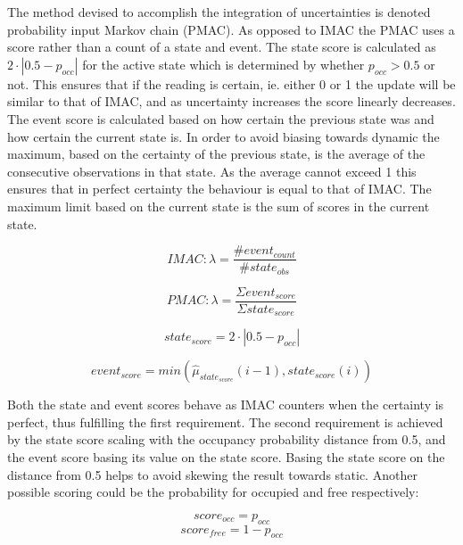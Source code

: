 The method devised to accomplish the integration of uncertainties is denoted probability input Markov chain (PMAC). As opposed to IMAC the PMAC uses a score rather than a count of a state and event. The state score is calculated as  \(2\cdot|0.5-p_{occ}|\) for the active state which is determined by whether \(p_{occ} > 0.5\) or not. This ensures that if the reading is certain, ie. either 0 or 1 the update will be similar to that of IMAC, and as uncertainty increases the score linearly decreases. The event score is calculated based on how certain the previous state was and how certain the current state is. In order to avoid biasing towards dynamic the maximum, based on the certainty of the previous state, is the average of the consecutive observations in that state. As the average cannot exceed 1 this ensures that in perfect certainty the behaviour is equal to that of IMAC. The maximum limit based on the current state is the sum of scores in the current state.

\begin{equation}
IMAC: \lambda = \frac{\#event_{count}}{\#state_{obs}}
\end{equation}

\begin{equation}
PMAC: \lambda = \frac{\Sigma event_{score}}{\Sigma state_{score}}
\end{equation}

\begin{equation}
state_{score}=2 \cdot |0.5-p_{occ}| 
\end{equation}

\begin{equation}
event_{score}=min(\hat{\mu}_{state_{score}}(i-1),state_{score}(i))
\end{equation}

Both the state and event scores behave as IMAC counters when the certainty is perfect, thus fulfilling the first requirement. The second requirement is achieved by the state score scaling with the occupancy probability distance from 0.5, and the event score basing its value on the state score. Basing the state score on the distance from 0.5 helps to avoid skewing the result towards static. Another possible scoring could be the probability for occupied and free respectively: 

\begin{equation}
score_{occ} = p_{occ}
\end{equation}
\begin{equation}
score_{free} = 1-p_{occ}
\end{equation}


